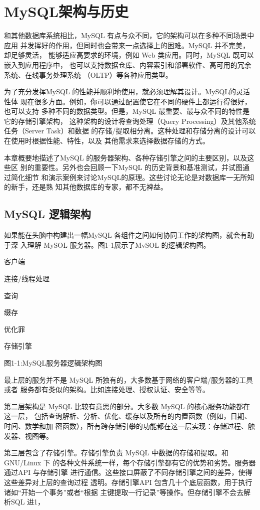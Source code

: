\chapter{MySQL架构与历史}
和其他数据库系统相比，MySQL 有点与众不同，它的架构可以在多种不同场景中应用
并发挥好的作用，但同时也会带来一点选择上的困难。MySQL 并不完美，却足够灵活，
能够适应高要求的环境，例如 Web 类应用。同时，MySQL 既可以嵌入到应用程序中，
也可以支持数据仓库、内容索引和部署软件、高可用的冗余系统、在线事务处理系统
（OLTP）等各种应用类型。

为了充分发挥MySQL 的性能并顺利地使用，就必须理解其设计。MySQL的灵活性体
现在很多方面。例如，你可以通过配置使它在不同的硬件上都运行得很好，也可以支持
多种不同的数据类型。但是，MySQL 最重要、最与众不同的特性是它的存储引擎架构，
这种架构的设计将查询处理（Query Processing）及其他系统任务（Server Task）和数据
的存储/提取相分离。这种处理和存储分离的设计可以在使用时根据性能、特性，以及
其他需求来选择数据存储的方式。

本章概要地描述了MySQL 的服务器架构、各种存储引擎之间的主要区别，以及这些区
别的重要性。另外也会回顾一下MySQL 的历史背景和基准测试，并试图通过简化细节
和演示案例来讨论MySQL的原理。这些讨论无论是对数据库一无所知的新手，还是熟
知其他数据库的专家，都不无裨益。

\section{MySQL 逻辑架构}
如果能在头脑中构建出一幅MySQL 各组件之间如何协同工作的架构图，就会有助于深
入理解 MySOL 服务器。图1-1展示了MvSOL 的逻辑架构图。

客户端

连接/线程处理

查询

缀存

优化罪

存储引擎

图1-1:MySQL服务器逻辑架构图

最上层的服务并不是 MySQL 所独有的，大多数基于网络的客户端/服务器的工具或者
服务都有类似的架构。比如连接处理、授权认证、安全等等。

第二层架构是 MySQL 比较有意思的部分。大多数 MySQL 的核心服务功能都在这一层，
包括查询解析、分析、优化、缓存以及所有的内置函数（例如，日期、时间、数学和加
密函数），所有跨存储引攀的功能都在这一层实现：存储过程、触发器、视图等。

第三层包含了存储引擎。存储引擎负责 MySQL 中数据的存储和提取。和GNU/Linux 下
的各种文件系统一样，每个存储引擎都有它的优势和劣势。服务器通过API 与存储引擎
进行通信。这些接口屏蔽了不同存储引擎之间的差异，使得这些差异对上层的查询过程
透明。存储引擎API 包含几十个底层函数，用于执行诸如“开始一个事务”或者“根据
主键提取一行记录”等操作。但存储引擎不会去解析SQL 进1，

